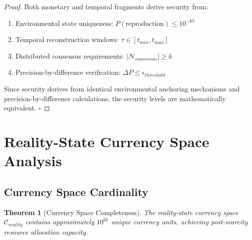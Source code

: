 \documentclass[12pt,a4paper]{article}
\newtheorem{theorem}{Theorem}
\begin{document}
\begin{proof}
Both monetary and temporal fragments derive security from:
\begin{enumerate}
\item Environmental state uniqueness: $P(\text{reproduction}) \leq 10^{-65}$
\item Temporal reconstruction windows: $\tau \in [t_{min}, t_{max}]$
\item Distributed consensus requirements: $|\mathcal{N}_{consensus}| \geq k$
\item Precision-by-difference verification: $\Delta P \leq \epsilon_{threshold}$
\end{enumerate}

Since security derives from identical environmental anchoring mechanisms and precision-by-difference calculations, the security levels are mathematically equivalent. $\square$
\end{proof}

\section{Reality-State Currency Space Analysis}

\subsection{Currency Space Cardinality}

\begin{theorem}[Currency Space Completeness]
The reality-state currency space $\mathcal{C}_{reality}$ contains approximately $10^{65}$ unique currency units, achieving post-scarcity resource allocation capacity.
\end{theorem}
\end{document}
